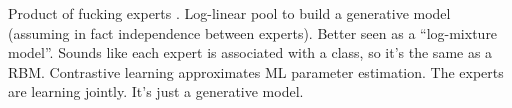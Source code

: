\documentclass[english]{scrartcl}
\begin{document}






{\color{red}Product of fucking experts \cite{Hinton-02}. Log-linear pool to build a generative model (assuming in fact independence between experts). Better seen as a ``log-mixture model''. Sounds like each expert is associated with a class, so it's the same as a RBM. Contrastive learning approximates ML parameter estimation. The experts are learning jointly. It's just a generative model.}
\end{document}
